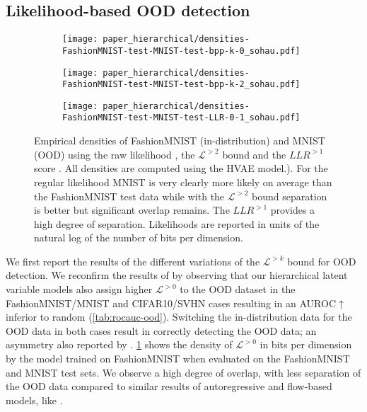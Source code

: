 \subsection{Likelihood-based OOD detection}
\begin{figure}
    \centering
    \begin{subfigure}[l]{0.48\columnwidth}
        \centering
        \texttt{[image: paper\_hierarchical/densities-FashionMNIST-test-MNIST-test-bpp-k-0\_sohau.pdf]}
        \caption{}
        \label{fig:FMNIST-elbo-k0}
    \end{subfigure}
    \begin{subfigure}[c]{0.48\columnwidth}
        \centering
        \texttt{[image: paper\_hierarchical/densities-FashionMNIST-test-MNIST-test-bpp-k-2\_sohau.pdf]}
        \caption{}
        \label{fig:FMNIST-elbo-k2}
    \end{subfigure}
    \begin{subfigure}[r]{0.48\columnwidth}
        \centering
        \texttt{[image: paper\_hierarchical/densities-FashionMNIST-test-MNIST-test-LLR-0-1\_sohau.pdf]}
        \caption{}
        \label{fig:FMNIST-llr}
    \end{subfigure}
    \caption[Empirical densities of FashionMNIST (in-distribution) and MNIST (OOD) using the raw likelihood and $\mathcal{L}^{>2}$ bound]{%
    Empirical densities of FashionMNIST (in-distribution) and MNIST (OOD) using the raw likelihood , the $\mathcal{L}^{>2}$ bound  and the $LLR^{>1}$ score . All densities are computed using the HVAE model.).
    For the regular likelihood MNIST is very clearly more likely on average than the FashionMNIST test data while with the $\mathcal{L}^{>2}$ bound separation is better but significant overlap remains.
    The $LLR^{>1}$ provides a high degree of separation. Likelihoods are reported in units of the natural log of the number of bits per dimension.
    }
    \label{fig:FMNIST-ood-densities}
\end{figure}

We first report the results of the different variations of the $\mathcal{L}^{>k}$ bound for OOD detection. 
We reconfirm the results of \textcite{nalisnick_deep_2019} by observing that our hierarchical latent variable models also assign higher $\mathcal{L}^{>0}$ to the OOD dataset in the FashionMNIST/MNIST and CIFAR10/SVHN cases resulting in an AUROC$\uparrow$ inferior to random (\cref{tab:rocauc-ood}).
Switching the in-distribution data for the OOD data in both cases result in correctly detecting the OOD data; an asymmetry also reported by \textcite{nalisnick_deep_2019}.
\cref{fig:FMNIST-elbo-k0} shows the density of $\mathcal{L}^{>0}$ in bits per dimension \cite{theis_note_2016} by the model trained on FashionMNIST when evaluated on the FashionMNIST and MNIST test sets.
We observe a high degree of overlap, with less separation of the OOD data compared to similar results of autoregressive and flow-based models, like \textcite{xiao_likelihood_2020}.


